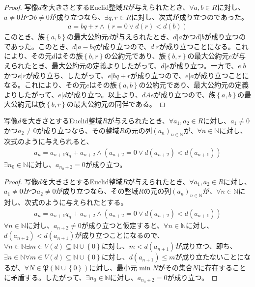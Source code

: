 \documentclass[dvipdfmx]{jsarticle}
\begin{document}
\begin{proof}
写像$d$を大きさとするEuclid整域$R$が与えられたとき、$\forall a,b \in R$に対し、$a \neq 0$かつ$b \neq 0$が成り立つなら、$\exists q,r \in R$に対し、次式が成り立つのであった。
\begin{align*}
a = bq + r \land \left( r = 0 \vee d(r) < d(b) \right)
\end{align*}
このとき、族$\left\{ a,b \right\}$の最大公約元$d$が与えられたとき、$d|a$かつ$d|b$が成り立つのであった。このとき、$d|a - bq$が成り立つので、$d|r$が成り立つことになる。これにより、その元$d$はその族$\left\{ b,r \right\}$の公約元であり、族$\left\{ b,r \right\}$の最大公約元$e$が与えられたとき、最大公約元の定義よりしたがって、$d|e$が成り立つ。一方で、$e|b$かつ$e|r$が成り立ち、したがって、$e|bq + r$が成り立つので、$e|a$が成り立つことになる。これにより、その元$e$はその族$\left\{ a,b \right\}$の公約元であり、最大公約元の定義よりしたがって、$e|d$が成り立つ。以上より、$dAe$が成り立つので、族$\left\{ a,b \right\}$の最大公約元は族$\left\{ b,r \right\}$の最大公約元の同伴である。
\end{proof}
\begin{thm}\label{3.3.4.17}
写像$d$を大きさとするEuclid整域$R$が与えられたとき、$\forall a_{1},a_{2} \in R$に対し、$a_{1} \neq 0$かつ$a_{2} \neq 0$が成り立つなら、その整域$R$の元の列$\left( a_{n} \right)_{n \in \mathbb{N}}$が、$\forall n \in \mathbb{N}$に対し、次式のように与えられると、
\begin{align*}
a_{n} = a_{n + 1}q_{n} + a_{n + 2} \land \left( a_{n + 2} = 0 \vee d\left( a_{n + 2} \right) < d\left( a_{n + 1} \right) \right)
\end{align*}
$\exists n_{0} \in \mathbb{N}$に対し、$a_{n_{0} + 2} = 0$が成り立つ。
\end{thm}
\begin{proof}
写像$d$を大きさとするEuclid整域$R$が与えられたとき、$\forall a_{1},a_{2} \in R$に対し、$a_{1} \neq 0$かつ$a_{2} \neq 0$が成り立つなら、その整域$R$の元の列$\left( a_{n} \right)_{n \in \mathbb{N}}$が、$\forall n \in \mathbb{N}$に対し、次式のように与えられたとする。
\begin{align*}
a_{n} = a_{n + 1}q_{n} + a_{n + 2} \land \left( a_{n + 2} = 0 \vee d\left( a_{n + 2} \right) < d\left( a_{n + 1} \right) \right)
\end{align*}
$\forall n \in \mathbb{N}$に対し、$a_{n + 2} \neq 0$が成り立つと仮定すると、$\forall n \in \mathbb{N}$に対し、$d\left( a_{n + 2} \right) < d\left( a_{n + 1} \right)$が成り立つことになるので、$\forall n \in \mathbb{N}\exists m \in V(d) \subseteq \mathbb{N} \cup \left\{ 0 \right\}$に対し、$m < d\left( a_{n + 1} \right)$が成り立つ、即ち、$\exists n \in \mathbb{N}\forall m \in V(d) \subseteq \mathbb{N} \cup \left\{ 0 \right\}$に対し、$d\left( a_{n + 1} \right) \leq m$が成り立たないことになるが、$\forall N \in \mathfrak{P}\left( \mathbb{N} \cup \left\{ 0 \right\} \right)$に対し、最小元$\min N$がその集合$N$に存在することに矛盾する。したがって、$\exists n_{0} \in \mathbb{N}$に対し、$a_{n_{0} + 2} = 0$が成り立つ。
\end{proof}
\end{document}
